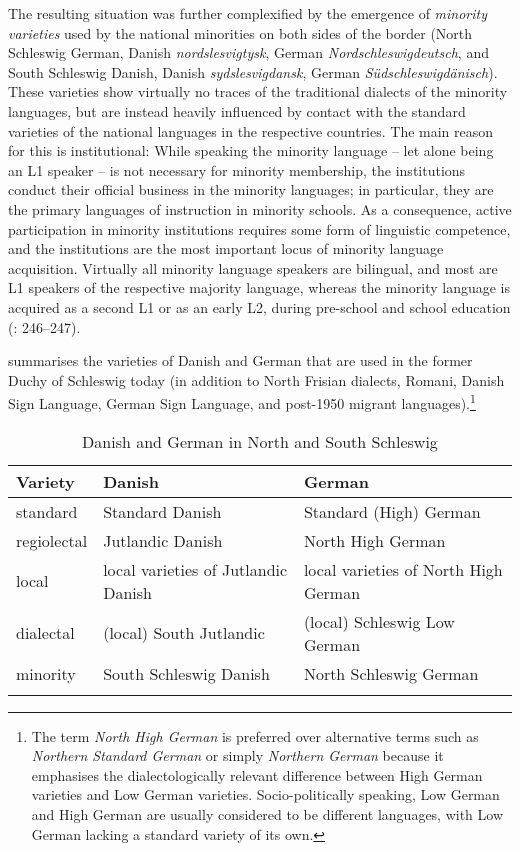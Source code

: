 \documentclass[output=paper]{langsci/langscibook}
\begin{document}
The resulting situation was further complexified by the emergence of \textit{minority varieties} used by the national minorities on both sides of the border (North Schleswig German, Danish \textit{nordslesvigtysk}, German \textit{Nordschleswigdeutsch}, and South Schleswig Danish, Danish \textit{sydslesvigdansk}, German \textit{Südschleswigdänisch}). These varieties show virtually no traces of the traditional dialects of the minority languages, but are instead heavily influenced by contact with the standard varieties of the national languages in the respective countries. The main reason for this is institutional: While speaking the minority language – let alone being an L1 speaker – is not necessary for minority membership, the institutions conduct their official business in the minority languages; in particular, they are the primary languages of instruction in minority schools. As a consequence, active participation in minority institutions requires some form of linguistic competence, and the institutions are the most important locus of minority language acquisition. Virtually all minority language speakers are bilingual, and most are L1 speakers of the respective majority language, whereas the minority language is acquired as a second L1 or as an early L2, during pre-school and school education (\citealt{Kuhl.2015}: 246–247).

\begin{sloppypar}
 summarises the varieties of Danish and German that are used in the former Duchy of Schleswig today (in addition to North Frisian dialects, Romani, Danish Sign Language, German Sign Language, and post-1950 migrant languages).\footnote{The term \textit{North High German} is preferred over alternative terms such as \textit{Northern Standard German} or simply \textit{Northern German} because it emphasises the dialectologically relevant difference between High German varieties and Low German varieties. Socio-politically speaking, Low German and High German are usually considered to be different languages, with Low German lacking a standard variety of its own.}
\end{sloppypar}

\begin{table}
\begin{tabularx}{\textwidth}{lQQ}
\lsptoprule
Variety & Danish & German\\
\midrule
standard & Standard Danish & Standard (High) German\\
regiolectal & Jutlandic Danish & North High German\\
local & local varieties of Jutlandic Danish & local varieties of North High German\\
dialectal & (local) South Jutlandic & (local) Schleswig Low German\\
minority & South Schleswig Danish & North Schleswig German\\
\lspbottomrule
\end{tabularx}
\caption{Danish and German in North and South Schleswig\label{tab:hoeder:1}}
\end{table}
\end{document}

